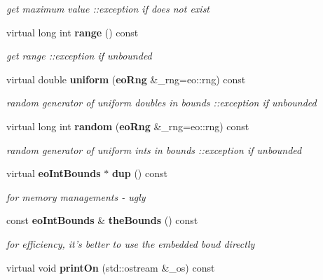 \begin{CompactItemize}
\begin{CompactList}\small\item\em get maximum value ::exception if does not exist \item\end{CompactList}\item 
virtual long int {\bf range} () const \label{classeo_general_int_bounds_a13}

\begin{CompactList}\small\item\em get range ::exception if unbounded \item\end{CompactList}\item 
virtual double {\bf uniform} ({\bf eo\-Rng} \&\_\-rng=eo::rng) const \label{classeo_general_int_bounds_a14}

\begin{CompactList}\small\item\em random generator of uniform doubles in bounds ::exception if unbounded \item\end{CompactList}\item 
virtual long int {\bf random} ({\bf eo\-Rng} \&\_\-rng=eo::rng) const \label{classeo_general_int_bounds_a15}

\begin{CompactList}\small\item\em random generator of uniform ints in bounds ::exception if unbounded \item\end{CompactList}\item 
virtual {\bf eo\-Int\-Bounds} $\ast$ {\bf dup} () const \label{classeo_general_int_bounds_a16}

\begin{CompactList}\small\item\em for memory managements - ugly \item\end{CompactList}\item 
const {\bf eo\-Int\-Bounds} \& {\bf the\-Bounds} () const \label{classeo_general_int_bounds_a17}

\begin{CompactList}\small\item\em for efficiency, it's better to use the embedded boud directly \item\end{CompactList}\item 
virtual void {\bf print\-On} (std::ostream \&\_\-os) const \label{classeo_general_int_bounds_a18}


\end{CompactItemize}
